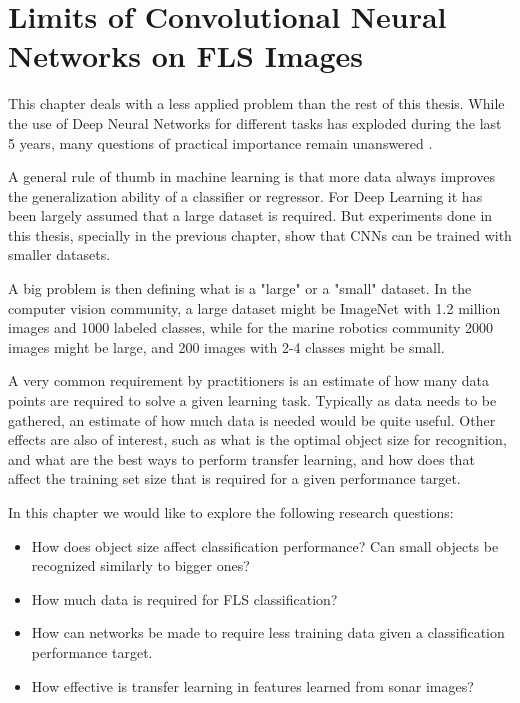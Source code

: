 \chapter[Limits of Convolutional Neural Networks on FLS Images]{Limits of Convolutional \newline Neural Networks on FLS Images}
\label{chapter:limits}

This chapter deals with a less applied problem than the rest of this thesis. While the use of Deep Neural Networks for different tasks has exploded during the last 5 years, many questions of practical importance remain unanswered \cite{zhang2016understanding}.

A general rule of thumb in machine learning is that more data always improves the generalization ability of a classifier or regressor. For Deep Learning it has been largely assumed that a large dataset is required. But experiments done in this thesis, specially in the previous chapter, show that CNNs can be trained with smaller datasets.

A big problem is then defining what is a "large" or a "small" dataset. In the computer vision community, a large dataset might be ImageNet \cite{russakovsky2015imagenet} with 1.2 million images and 1000 labeled classes, while for the marine robotics community 2000 images might be large, and 200 images with 2-4 classes might be small.

A very common requirement by practitioners is an estimate of how many data points are required to solve a given learning task. Typically as data needs to be gathered, an estimate of how much data is needed would be quite useful. Other effects are also of interest, such as what is the optimal object size for recognition, and what are the best ways to perform transfer learning, and how does that affect the training set size that is required for a given performance target.

In this chapter we would like to explore the following research questions:

\begin{itemize}
	\item How does object size affect classification performance? Can small objects be recognized similarly to bigger ones?
	\item How much data is required for FLS classification?
	\item How can networks be made to require less training data given a classification performance target.
	\item How effective is transfer learning in features learned from sonar images?
\end{itemize}

